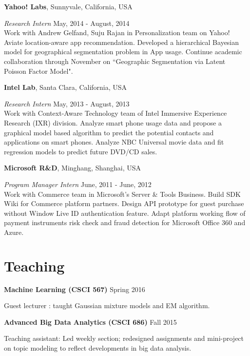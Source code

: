 \documentclass[margin,line]{res}
\begin{document}
\begin{resume}
{\bf  Yahoo! Labs}, Sunnyvale, California, USA

\vspace{-.3cm}
{\em Research Intern} \hfill { May, 2014 - August, 2014}\\
Work with Andrew Gelfand, Suju Rajan in Personalization team on Yahoo! Aviate location-aware app recommendation. Developed a hierarchical Bayesian model for geographical segmentation problem in App usage. Continue academic collaboration through November on ``Geographic Segmentation via Latent Poisson Factor Model".



{\bf  Intel Lab}, Santa Clara, California, USA

\vspace{-.3cm}
{\em Research Intern} \hfill { May, 2013 - August, 2013}\\
Work with Context-Aware Technology team of Intel Immersive Experience Research (IXR) division. 
Analyze smart phone usage data and propose a graphical model based algorithm to predict the potential contacts and applications on smart phones.
Analyze NBC Universal movie data and fit regression models to predict future DVD/CD sales.

{\bf  Microsoft R\&D}, Minghang, Shanghai, USA

\vspace{-.3cm}
{\em Program Manager Intern} \hfill {June, 2011 
- June, 2012}\\
 Work with Commerce team in Microsoft’s Server \& Tools Business.
 Build SDK Wiki for Commerce platform partners.  
 Design API prototype for guest purchase without Window Live ID authentication feature.
Adapt platform working flow of payment instruments risk check and fraud detection for Microsoft Office 360 and Azure.


\section{\sc Teaching }
 {\bf Machine Learning (CSCI 567)}   \hfill  { Spring 2016 } 
 
 \vspace{-.3cm}
 Guest  lecturer : taught Gaussian mixture models and EM algorithm.
 
 
 {\bf Advanced Big Data Analytics (CSCI 686)}   \hfill  {Fall 2015} 
 
 \vspace{-.3cm}
Teaching assistant: Led weekly section; redesigned assignments and mini-project on topic modeling to reflect developments in big data analysis. 


\end{resume}
\end{document}
